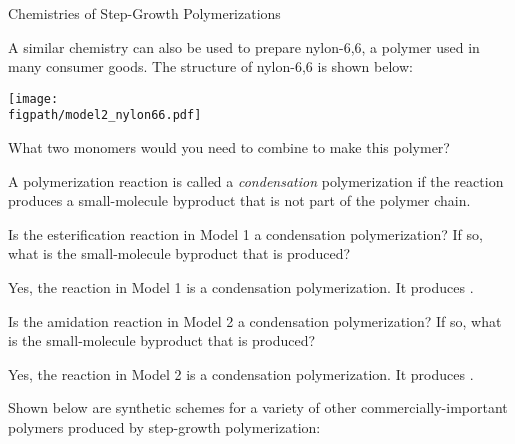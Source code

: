 \begin{activity}{Chemistries of Step-Growth Polymerizations}
\begin{ctqs}
		\clearpage
		\question A similar chemistry can also be used to prepare nylon-6,6, a polymer used in many consumer goods.
		The structure of nylon-6,6 is shown below:
		
			\centerline{\texttt{[image: \\figpath/model2\_nylon66.pdf]}}
			
		What two monomers would you need to combine to make this polymer?
			
				\begin{solution}[2in]
				\end{solution}
			
\end{ctqs}
	
\begin{infobox}

A polymerization reaction is called a \emph{condensation} polymerization if the reaction produces a small-molecule byproduct that is not part of the polymer chain.

\end{infobox}
	
\begin{ctqs}
		\question Is the esterification reaction in Model 1 a condensation polymerization?  If so, what is the small-molecule byproduct that is produced?
			
				\begin{solution}[1in]
					Yes, the reaction in Model 1 is a condensation polymerization. It produces .
				\end{solution}
		
		\question Is the amidation reaction in Model 2 a condensation polymerization?  If so, what is the small-molecule byproduct that is produced?
			
				\begin{solution}[1in]
					Yes, the reaction in Model 2 is a condensation polymerization. It produces .
				\end{solution}
		
\end{ctqs}

\begin{model}
\label{\labelbase:model:otherstepgrowthchems}

Shown below are synthetic schemes for a variety of other commercially-important polymers produced by step-growth polymerization:


\end{model}
\end{activity}
